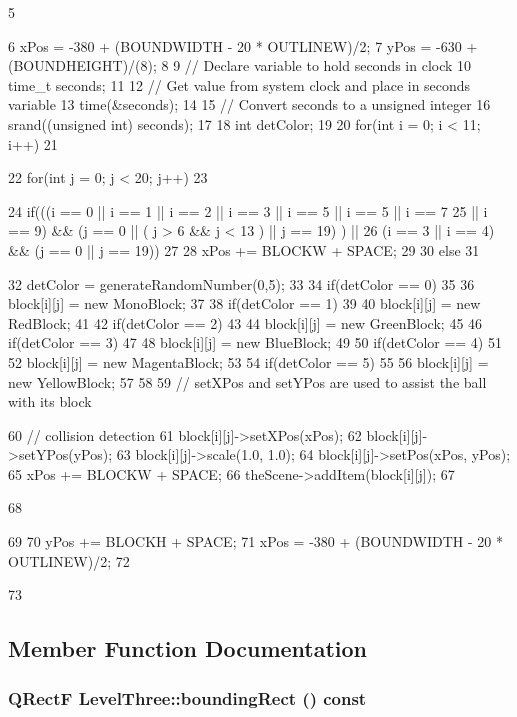 \begin{DoxyCode}
5 {
6     xPos = -380 + (BOUNDWIDTH - 20 * OUTLINEW)/2;
7     yPos = -630 + (BOUNDHEIGHT)/(8);
8 
9     // Declare variable to hold seconds in clock
10     time_t seconds;
11 
12     // Get value from system clock and place in seconds variable
13     time(&seconds);
14 
15     // Convert seconds to a unsigned integer
16     srand((unsigned int) seconds);
17 
18     int detColor;
19 
20     for(int i = 0; i < 11; i++)
21     {
22         for(int j = 0; j < 20; j++)
23         {
24             if(((i == 0 || i == 1 || i == 2 || i == 3 || i == 5 || i == 5 || i ==
       7
25                  || i == 9) && (j == 0 || ( j > 6 && j < 13 ) || j == 19) ) ||
26                  (i == 3 || i == 4) && (j == 0 || j == 19))
27             {
28                 xPos += BLOCKW + SPACE;
29             }
30             else
31             {
32                 detColor = generateRandomNumber(0,5);
33 
34                 if(detColor == 0)
35                 {
36                     block[i][j] = new MonoBlock;
37                 }
38                 if(detColor == 1)
39                 {
40                     block[i][j] = new RedBlock;
41                 }
42                 if(detColor == 2)
43                 {
44                     block[i][j] = new GreenBlock;
45                 }
46                 if(detColor == 3)
47                 {
48                     block[i][j] = new BlueBlock;
49                 }
50                 if(detColor == 4)
51                 {
52                     block[i][j] = new MagentaBlock;
53                 }
54                 if(detColor == 5)
55                 {
56                     block[i][j] = new YellowBlock;
57                 }
58 
59                 // setXPos and setYPos are used to assist the ball with its block
      
60                 // collision detection
61                 block[i][j]->setXPos(xPos);
62                 block[i][j]->setYPos(yPos);
63                 block[i][j]->scale(1.0, 1.0);
64                 block[i][j]->setPos(xPos, yPos);
65                 xPos += BLOCKW + SPACE;
66                 theScene->addItem(block[i][j]);
67             }
68         }
69 
70         yPos += BLOCKH + SPACE;
71         xPos = -380 + (BOUNDWIDTH - 20 * OUTLINEW)/2;
72     }
73 }
\end{DoxyCode}


\subsection{Member Function Documentation}
\hypertarget{class_level_three_a6c6267a96819454c27eb39c0b5ea8393}{
\subsubsection[{boundingRect}]{\setlength{\rightskip}{0pt plus 5cm}QRectF LevelThree::boundingRect () const}}
\label{class_level_three_a6c6267a96819454c27eb39c0b5ea8393}


